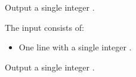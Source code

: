 \problemname{}

Output a single integer .

\begin{Input}
    The input consists of:
    \begin{itemize}
        \item One line with a single integer .
    \end{itemize}
\end{Input}

\begin{Output}
    Output a single integer .
\end{Output}
